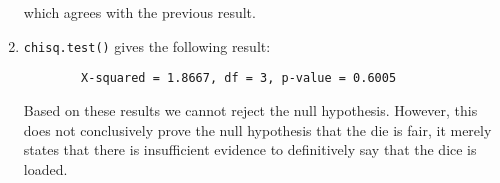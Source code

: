 \begin{solution}
\begin{enumerate}[label = (\alph*)]
    which agrees with the previous result.

    \item \texttt{chisq.test()} gives the following result:
    
    \begin{lstlisting}
        X-squared = 1.8667, df = 3, p-value = 0.6005
    \end{lstlisting}

    Based on these results we cannot reject the null hypothesis.
    However, this does not conclusively prove the null hypothesis that the die is fair,
    it merely states that there is insufficient evidence to definitively say that the dice is loaded.
\end{enumerate}

\end{solution}

